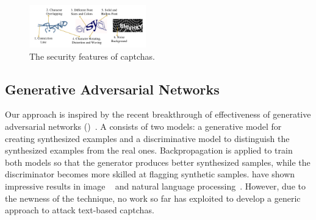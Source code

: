 \begin{figure}[!t]
  \centering
  \includegraphics[width=0.45\textwidth]{fig/security_features/security_features.pdf}
  \caption{The security features of captchas.}
  \label{fig:security_features}
\end{figure}

%
%

\subsection{Generative Adversarial Networks}
Our approach is inspired by the recent breakthrough of effectiveness of generative adversarial networks
(\GANs)~\cite{Goodfellow2014Generative}. A \GAN consists of two models: a generative model for creating synthesized examples and a
discriminative model to distinguish the synthesized examples from the real ones. Backpropagation is applied to train both models so that
the generator produces better synthesized samples, while the discriminator becomes more skilled at flagging synthetic samples. \GANs have
shown impressive results in image ~\cite{pix2pix2016,CycleGAN2017} and natural language processing~\cite{Yu2016SeqGAN,Li2017Adversarial}.
However, due to the newness of the technique, no work so far has exploited \GANs to develop a generic approach to attack text-based
captchas.

